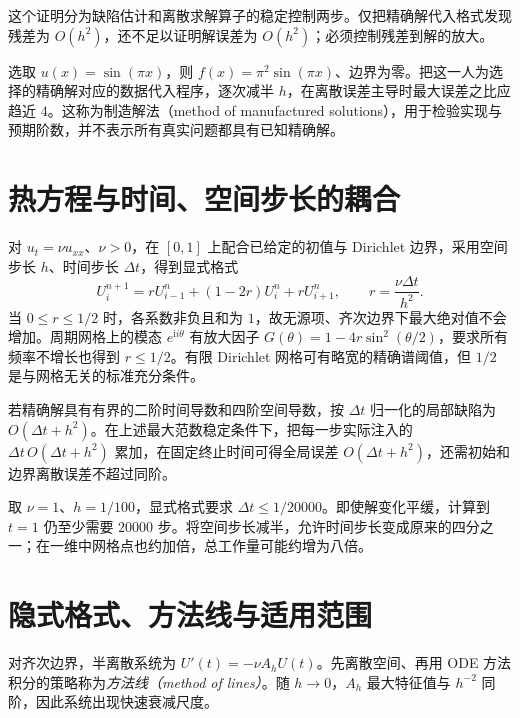 这个证明分为缺陷估计和离散求解算子的稳定控制两步。仅把精确解代入格式发现残差为 $O(h^2)$，还不足以证明解误差为 $O(h^2)$；必须控制残差到解的放大。

\begin{example}[制造解检验]
选取 $u(x)=\sin(\pi x)$，则 $f(x)=\pi^2\sin(\pi x)$、边界为零。把这一人为选择的精确解对应的数据代入程序，逐次减半 $h$，在离散误差主导时最大误差之比应趋近 $4$。这称为制造解法（method of manufactured solutions），用于检验实现与预期阶数，并不表示所有真实问题都具有已知精确解。
\end{example}

\section{热方程与时间、空间步长的耦合}
对 $u_t=\nu u_{xx}$、$\nu>0$，在 $[0,1]$ 上配合已给定的初值与 Dirichlet 边界，采用空间步长 $h$、时间步长 $\Delta t$，得到显式格式
\begin{equation}
 U_i^{n+1}=rU_{i-1}^n+(1-2r)U_i^n+rU_{i+1}^n,
 \qquad r=\frac{\nu\Delta t}{h^2}.
 \label{eq:na-heat-explicit}
\end{equation}
当 $0\le r\le1/2$ 时，各系数非负且和为 $1$，故无源项、齐次边界下最大绝对值不会增加。周期网格上的模态 $e^{\mathrm i i\theta}$ 有放大因子 $G(\theta)=1-4r\sin^2(\theta/2)$，要求所有频率不增长也得到 $r\le1/2$。有限 Dirichlet 网格可有略宽的精确谱阈值，但 $1/2$ 是与网格无关的标准充分条件。

若精确解具有有界的二阶时间导数和四阶空间导数，按 $\Delta t$ 归一化的局部缺陷为 $O(\Delta t+h^2)$。在上述最大范数稳定条件下，把每一步实际注入的 $\Delta t\,O(\Delta t+h^2)$ 累加，在固定终止时间可得全局误差 $O(\Delta t+h^2)$，还需初始和边界离散误差不超过同阶。

\begin{example}[稳定约束的实际代价]
取 $\nu=1$、$h=1/100$，显式格式要求 $\Delta t\le1/20000$。即使解变化平缓，计算到 $t=1$ 仍至少需要 $20000$ 步。将空间步长减半，允许时间步长变成原来的四分之一；在一维中网格点也约加倍，总工作量可能约增为八倍。
\end{example}

\section{隐式格式、方法线与适用范围}
对齐次边界，半离散系统为 $U'(t)=-\nu A_hU(t)$。先离散空间、再用 ODE 方法积分的策略称为\emph{方法线（method of lines）}。随 $h\to0$，$A_h$ 最大特征值与 $h^{-2}$ 同阶，因此系统出现快速衰减尺度。

